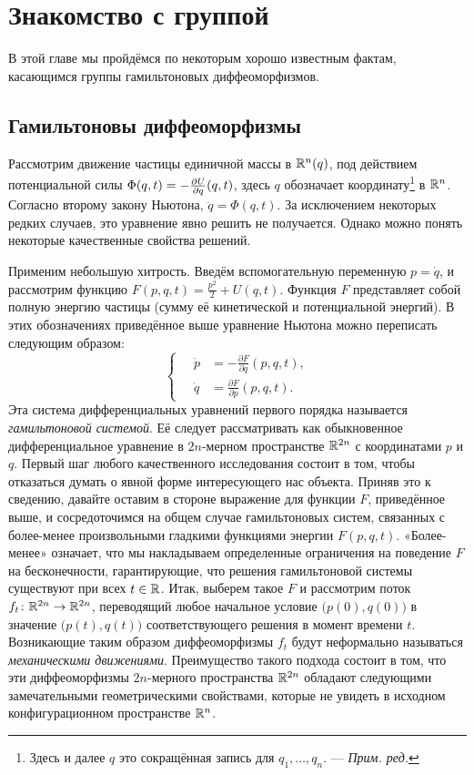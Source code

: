 \chapter{Знакомство с группой}\label{chap:1}

В этой главе мы пройдёмся по некоторым хорошо известным фактам,
касающимся группы гамильтоновых диффеоморфизмов. 

\section[Гамильтоновы диффеоморфизмы]{Гамильтоновы диффеоморфизмы}

Рассмотрим движение частицы единичной массы в $\mathbb{R}^n(q)$, под
действием потенциальной силы $\Phi(q, t)  \z= - \tfrac{\partial
  U}{\partial q} (q, t)$, здесь $q$ обозначает
координату\footnote{Здесь и далее  $q$ это сокращённая запись для
  $q_1,\dots,q_n$. — \textit{Прим. ред.}} в $\mathbb{R}^n$. 
Согласно второму закону Ньютона, $\ddot q= \Phi (q, t)$.
За исключением некоторых редких случаев, это уравнение явно решить не получается.
Однако можно понять некоторые качественные свойства решений.

Применим небольшую хитрость.
Введём вспомогательную переменную $p = \dot q$, и рассмотрим функцию
$F(p,q,t)= \tfrac {p^2} 2 + U (q, t)$. 
Функция $F$ представляет собой полную энергию частицы (сумму её
кинетической и потенциальной энергий). 
В этих обозначениях приведённое выше уравнение Ньютона можно переписать следующим образом:
\[
\begin{cases}
\quad\dot p &= - \tfrac{\partial F}{\partial q} (p, q, t),\\
\quad\dot q &= \tfrac{\partial F}{\partial p} (p, q, t).
\end{cases}
\]
Эта система дифференциальных уравнений первого порядка называется
\emph{гамильтоновой системой}. 
Её следует рассматривать как обыкновенное дифференциальное уравнение в
$2n$-мерном пространстве $\mathbb{R}^{2n}$ с координатами $p$ и $q$. 
Первый шаг любого качественного исследования состоит в том, чтобы
отказаться думать о явной форме интересующего нас объекта. 
Приняв это к сведению, давайте оставим в стороне выражение для функции $F$, приведённое выше, и сосредоточимся на общем случае гамильтоновых систем, связанных с
более-менее произвольными гладкими функциями энергии $F (p, q, t)$. 
«Более-менее» означает, что мы накладываем определенные ограничения на
поведение $F$ на бесконечности, гарантирующие, что решения
гамильтоновой системы существуют при всех $t\in \mathbb{R}$. 
Итак, выберем такое $F$ и рассмотрим поток $f_t\colon \mathbb{R}^{2n} \to
\mathbb{R}^{2n}$, переводящий любое начальное условие $\big(p(0),q(0)\big)$ в
значение $\big(p (t), q (t)\big)$ соответствующего решения в момент
времени $t$. 
Возникающие таким образом диффеоморфизмы $f_t$ будут неформально называться \emph{механическими движениями}.
Преимущество такого подхода состоит в том, что эти диффеоморфизмы $2n$-мерного пространства $\mathbb{R}^{2n}$ обладают следующими замечательными геометрическими свойствами, которые не увидеть в исходном конфигурационном пространстве $\mathbb{R}^n$.

